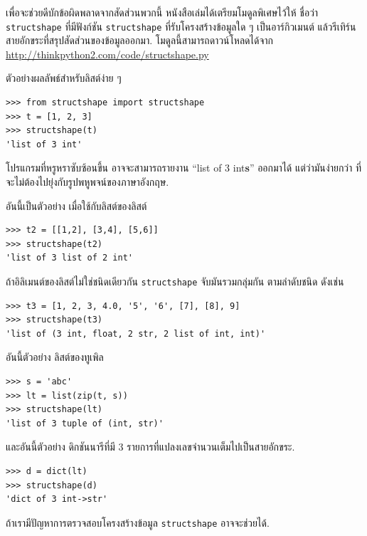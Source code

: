เพื่อจะช่วยดีบักข้อผิดพลาดจากสัดส่วนพวกนี้
หนังสือเล่มได้เตรียมโมดูลพิเศษไว้ให้ ชื่อว่า \texttt{structshape} 
ที่มีฟังก์ชัน \texttt{structshape}
ที่รับโครงสร้างข้อมูลใด ๆ เป็นอาร์กิวเมนต์ แล้วรีเทิร์นสายอักขระที่สรุปสัดส่วนของข้อมูลออกมา.
โมดูลนี้สามารถดาวน์โหลดได้จาก
\url{http://thinkpython2.com/code/structshape.py}

ตัวอย่างผลลัพธ์สำหรับลิสต์ง่าย ๆ

\begin{verbatim}
>>> from structshape import structshape
>>> t = [1, 2, 3]
>>> structshape(t)
'list of 3 int'
\end{verbatim}
%
%
โปรแกรมที่หรูหราซับซ้อนขึ้น อาจจะสามารถรายงาน
``list of 3 int\textbf{s}'' ออกมาได้
แต่ว่ามันง่ายกว่า ที่จะไม่ต้องไปยุ่งกับรูปพหูพจน์ของภาษาอังกฤษ.


อันนี้เป็นตัวอย่าง เมื่อใช้กับลิสต์ของลิสต์

\begin{verbatim}
>>> t2 = [[1,2], [3,4], [5,6]]
>>> structshape(t2)
'list of 3 list of 2 int'
\end{verbatim}
%
%
ถ้าอิลิเมนต์ของลิสต์ไม่ใช่ชนิดเดียวกัน
\texttt{structshape} จับมันรวมกลุ่มกัน ตามลำดับชนิด ดังเช่น

\begin{verbatim}
>>> t3 = [1, 2, 3, 4.0, '5', '6', [7], [8], 9]
>>> structshape(t3)
'list of (3 int, float, 2 str, 2 list of int, int)'
\end{verbatim}
%
%
อันนี้ตัวอย่าง ลิสต์ของทูเพิล

\begin{verbatim}
>>> s = 'abc'
>>> lt = list(zip(t, s))
>>> structshape(lt)
'list of 3 tuple of (int, str)'
\end{verbatim}
%
%
และอันนี้ตัวอย่าง ดิกชันนารีที่มี 3 รายการที่แปลงเลขจำนวนเต็มไปเป็นสายอักขระ.

\begin{verbatim}
>>> d = dict(lt) 
>>> structshape(d)
'dict of 3 int->str'
\end{verbatim}
%
%
ถ้าเรามีปัญหาการตรวจสอบโครงสร้างข้อมูล
\texttt{structshape} อาจจะช่วยได้.

